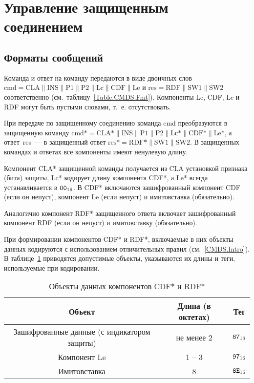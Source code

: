 \section{Управление защищенным соединением}
\label{CMDS.SM}

\subsection{Форматы сообщений}\label{CMDS.SM.Format}

Команда и ответ на команду передаются в виде двоичных слов 
$\text{cmd} = \text{CLA} \parallel \text{INS} \parallel \text{P1} \parallel 
\text{P2} \parallel \text{Lc} \parallel \text{CDF} \parallel \text{Le}$ и 
$\text{res} = \text{RDF} \parallel \text{SW1} \parallel \text{SW2}$ 
соответственно (см.~таблицу~\ref{Table.CMDS.Fmt}). 
%
Компоненты Lc, CDF, Le и RDF могут быть пустыми словами, т.~е. отсутствовать.

При передаче по защищенному соединению команда cmd преобразуются в защищенную 
команду
$\text{cmd*} = \text{CLA*} \parallel \text{INS} \parallel \text{P1} 
\parallel \text{P2} \parallel \text{Lс*} \parallel \text{CDF*} 
\parallel \text{Le*}$, а ответ~res~--- в защищенный ответ 
$\text{res*} = \text{RDF*} \parallel \text{SW1} \parallel \text{SW2}$. 
%
В защищенных командах и ответах все компоненты имеют ненулевую длину. 

Компонент CLA* защищенной команды получается из CLA установкой признака 
(бита) защиты, Lc* кодирует длину компонента CDF*, 
а Le* всегда устанавливается в $\texttt{00}_{16}$. 
%
В CDF* включаются зашифрованный компонент CDF (если он непуст), 
компонент Le (если непуст) и имитовставка (обязательно). 

Аналогично компонент RDF* защищенного ответа включает зашифрованный 
компонент RDF (если он непуст) и имитовставку (обязательно). 

При формировании компонентов CDF* и RDF*, включаемые в них объекты данных
кодируются с использованием отличительных правил (см.~\ref{CMDS.Intro}). 
В таблице~\ref{Table.CMDS.CDFRDF} приводятся допустимые объекты, 
указываются их длины и теги, используемые при кодировании. 

\begin{table}[h]
\caption{Объекты данных компонентов CDF* и RDF*}
\label{Table.CMDS.CDFRDF}
\begin{tabular}{|c|c|c|}
\hline
Объект & Длина (в октетах) & Тег \\
\hline
\hline
Зашифрованные данные (с индикатором защиты) & не менее 2 & $\texttt{87}_{16}$ \\
\hline
Компонент Le & 1 -- 3 & $\texttt{97}_{16}$\\
\hline      
Имитовставка & 8 & $\texttt{8E}_{16}$ \\
\hline
\end{tabular}
\end{table}

